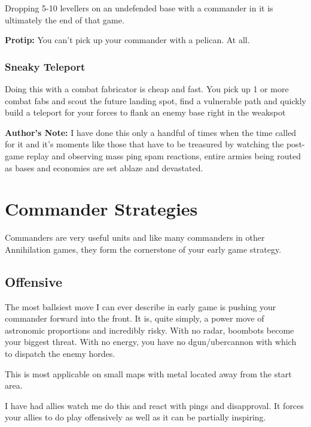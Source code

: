 \documentclass[]{article}
\begin{document}
Dropping 5-10 levellers on an undefended base with a commander in it is ultimately the end of that game.  

\textbf{Protip:}  You can't pick up your commander with a pelican.  At all.  

\subsubsection{Sneaky Teleport}

Doing this with a combat fabricator is cheap and fast.  You pick up 1 or more combat fabs and scout the future landing spot, find a vulnerable path and quickly build a teleport for your forces to flank an enemy base right in the weakspot

\textbf{Author's Note:}  I have done this only a handful of times when the time called for it and it's moments like those that have to be treasured by watching the post-game replay and observing mass ping spam reactions, entire armies being routed as bases and economies are set ablaze and devastated.  

\newpage
\section{Commander Strategies}  

Commanders are very useful units and like many commanders in other Annihilation games, they form the cornerstone of your early game strategy.  

\subsection{Offensive}

The most ballsiest move I can ever describe in early game is pushing your commander forward into the front.  It is, quite simply, a power move of astronomic proportions and incredibly risky.  With no radar, boombots become your biggest threat.  With no energy, you have no dgun/ubercannon with which to dispatch the enemy hordes.  

This is most applicable on small maps with metal located away from the start area.  

I have had allies watch me do this and react with pings and disapproval.  It forces your allies to do play offensively as well as it can be partially inspiring.  
\end{document}

